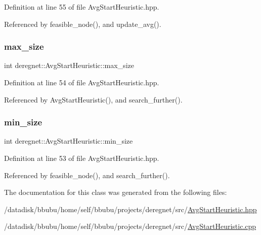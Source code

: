 Definition at line 55 of file Avg\+Start\+Heuristic.\+hpp.



Referenced by feasible\+\_\+node(), and update\+\_\+avg().

\mbox{\label{classderegnet_1_1AvgStartHeuristic_a4794e58ea33d94f9029defa3a31cc573}} 
\subsubsection{\texorpdfstring{max\+\_\+size}{max\_size}}
{\footnotesize\ttfamily int deregnet\+::\+Avg\+Start\+Heuristic\+::max\+\_\+size\hspace{0.3cm}{\ttfamily [private]}}



Definition at line 54 of file Avg\+Start\+Heuristic.\+hpp.



Referenced by Avg\+Start\+Heuristic(), and search\+\_\+further().

\mbox{\label{classderegnet_1_1AvgStartHeuristic_a3abc4d801d4eb1fdb8ecfed7077045b3}} 
\subsubsection{\texorpdfstring{min\+\_\+size}{min\_size}}
{\footnotesize\ttfamily int deregnet\+::\+Avg\+Start\+Heuristic\+::min\+\_\+size\hspace{0.3cm}{\ttfamily [private]}}



Definition at line 53 of file Avg\+Start\+Heuristic.\+hpp.



Referenced by feasible\+\_\+node(), and search\+\_\+further().



The documentation for this class was generated from the following files\+:\begin{DoxyCompactItemize}
\item 
/datadisk/bbubu/home/self/bbubu/projects/deregnet/src/\hyperlink{AvgStartHeuristic_8hpp}{Avg\+Start\+Heuristic.\+hpp}\item 
/datadisk/bbubu/home/self/bbubu/projects/deregnet/src/\hyperlink{AvgStartHeuristic_8cpp}{Avg\+Start\+Heuristic.\+cpp}\end{DoxyCompactItemize}
